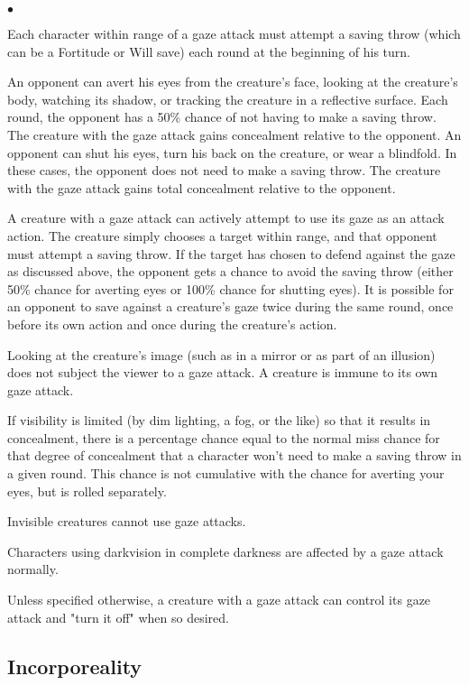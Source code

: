 \begin{list}{$\bullet$}{\itemspace}
	\item Each character within range of a gaze attack must attempt a saving throw (which can be a Fortitude or Will save) each round at the beginning of his turn.
	\item An opponent can avert his eyes from the creature's face, looking at the creature's body, watching its shadow, or tracking the creature in a reflective surface. Each round, the opponent has a 50\% chance of not having to make a saving throw. The creature with the gaze attack gains concealment relative to the opponent. An opponent can shut his eyes, turn his back on the creature, or wear a blindfold. In these cases, the opponent does not need to make a saving throw. The creature with the gaze attack gains total concealment relative to the opponent.
	\item A creature with a gaze attack can actively attempt to use its gaze as an attack action. The creature simply chooses a target within range, and that opponent must attempt a saving throw. If the target has chosen to defend against the gaze as discussed above, the opponent gets a chance to avoid the saving throw (either 50\% chance for averting eyes or 100\% chance for shutting eyes). It is possible for an opponent to save against a creature's gaze twice during the same round, once before its own action and once during the creature's action.
	\item Looking at the creature's image (such as in a mirror or as part of an illusion) does not subject the viewer to a gaze attack.
A creature is immune to its own gaze attack.
	\item If visibility is limited (by dim lighting, a fog, or the like) so that it results in concealment, there is a percentage chance equal to the normal miss chance for that degree of concealment that a character won't need to make a saving throw in a given round. This chance is not cumulative with the chance for averting your eyes, but is rolled separately.
	\item Invisible creatures cannot use gaze attacks.
	\item Characters using darkvision in complete darkness are affected by a gaze attack normally.
	\item Unless specified otherwise, a creature with a gaze attack can control its gaze attack and "turn it off" when so desired.
\end{list}

\subsection{Incorporeality}

